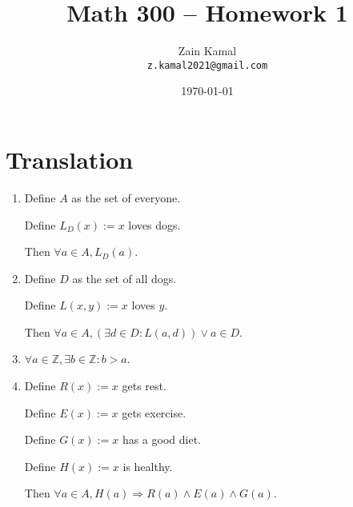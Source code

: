 \documentclass{article}
\title{Math 300 -- Homework 1} %
\author{Zain Kamal\\ \texttt{z.kamal2021@gmail.com}} %
\date{\today} %
\begin{document}
\maketitle %

\section{Translation} %

\begin{enumerate}[label=\alph*)]
    \item 
    Define $A$ as the set of everyone.

    Define $L_D(x) := x$ loves dogs.
    
    Then $\forall a \in A, L_D(a)$.
    \item 
    Define $D$ as the set of all dogs.
    
    Define $L(x,y) := x$ loves $y$.
    
    Then $\forall a \in A, (\exists d \in D : L(a, d)) \lor a \in D$.
    
    
    
    
    
    
    \item
    
    $\forall a \in \mathbb{Z}, \exists b \in \mathbb{Z} : b > a$.
    
    
    
    \item
    Define $R(x) := x$ gets rest.
    
    Define $E(x) := x$ gets exercise.
    
    Define $G(x) := x$ has a good diet.
    
    Define $H(x) := x$ is healthy.
    
    Then $\forall a \in A, H(a) \Rightarrow R(a) \land E(a) \land G(a)$.
    

\end{enumerate}
\end{document}
